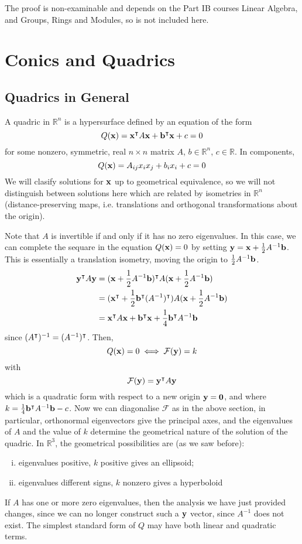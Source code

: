 \documentclass{article}
\begin{document}
The proof is non-examinable and depends on the Part IB courses Linear Algebra, and Groups, Rings and Modules, so is not included here.

\section{Conics and Quadrics}
\subsection{Quadrics in General}
A quadric in $\mathbb R^n$ is a hypersurface defined by an equation of the form
\[ Q(\vb x) = \vb x^\intercal A \vb x + \vb b^\intercal \vb x + c = 0 \]
for some nonzero, symmetric, real $n \times n$ matrix $A$, $b \in \mathbb R^n$, $c \in \mathbb R$. In components,
\[ Q(\vb x) = A_{ij}x_ix_j + b_ix_i + c = 0 \]
We will clasify solutions for $\vb x$ up to geometrical equivalence, so we will not distinguish between solutions here which are related by isometries in $\mathbb R^n$ (distance-preserving maps, i.e. translations and orthogonal transformations about the origin).

Note that $A$ is invertible if and only if it has no zero eigenvalues. In this case, we can complete the sequare in the equation $Q(\vb x) = 0$ by setting $\vb y = \vb x + \frac{1}{2}A^{-1} \vb b$. This is essentially a translation isometry, moving the origin to $\frac{1}{2}A^{-1} \vb b$.
\begin{align*}
    \vb y^\intercal A \vb y & = (\vb x + \frac{1}{2}A^{-1}\vb b)^\intercal A (\vb x + \frac{1}{2}A^{-1}\vb b)                         \\
                             & = (\vb x^\intercal + \frac{1}{2}\vb b^\intercal(A^{-1})^\intercal) A (\vb x + \frac{1}{2}A^{-1}\vb b) \\
                             & = \vb x^\intercal A \vb x + \vb b^\intercal \vb x + \frac{1}{4}\vb b^\intercal A^{-1}\vb b
\end{align*}
since $(A^\intercal)^{-1} = (A^{-1})^\intercal$. Then,
\[ Q(\vb x) = 0 \iff \mathcal F(\vb y) = k \]
with
\[ \mathcal F(\vb y) = \vb y^\intercal A \vb y \]
which is a quadratic form with respect to a new origin $\vb y = \vb 0$, and where $k = \frac{1}{4}\vb b^\intercal A^{-1}\vb b - c$. Now we can diagonalise $\mathcal F$ as in the above section, in particular, orthonormal eigenvectors give the principal axes, and the eigenvalues of $A$ and the value of $k$ determine the geometrical nature of the solution of the quadric. In $\mathbb R^3$, the geometrical possibilities are (as we saw before):
\begin{enumerate}[(i)]
    \item eigenvalues positive, $k$ positive gives an ellipsoid;
    \item eigenvalues different signs, $k$ nonzero gives a hyperboloid
\end{enumerate}
If $A$ has one or more zero eigenvalues, then the analysis we have just provided changes, since we can no longer construct such a $\vb y$ vector, since $A^{-1}$ does not exist. The simplest standard form of $Q$ may have both linear and quadratic terms.
\end{document}
